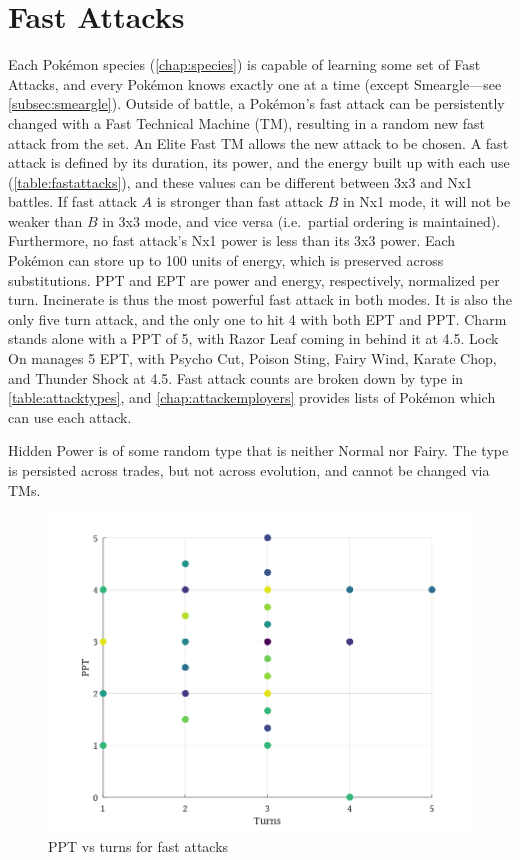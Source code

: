 \section{Fast Attacks}
Each Pokémon species (\autoref{chap:species}) is capable of learning some set of Fast Attacks, 
  and every Pokémon knows exactly one at a time (except Smeargle---see \autoref{subsec:smeargle}).
Outside of battle, a Pokémon's fast attack can be persistently changed with a
  Fast Technical Machine (TM), resulting in a random new fast attack from the set.
An Elite Fast TM allows the new attack to be chosen.
A fast attack is defined by its duration, its power, and the energy built up with each use (\autoref{table:fastattacks}),
  and these values can be different between 3x3 and Nx1 battles.
If fast attack $A$ is stronger than fast attack $B$ in Nx1 mode, it will not be
  weaker than $B$ in 3x3 mode, and vice versa (i.e.\ partial ordering is maintained).
Furthermore, no fast attack's Nx1 power is less than its 3x3 power.
Each Pokémon can store up to 100 units of energy, which is preserved across substitutions.
PPT and EPT are power and energy, respectively, normalized per turn.
Incinerate is thus the most powerful fast attack in both modes.
It is also the only five turn attack, and the only one to hit 4 with both EPT and PPT\@.
Charm stands alone with a PPT of 5, with Razor Leaf coming in behind it at 4.5.
Lock On manages 5 EPT, with Psycho Cut, Poison Sting, Fairy Wind, Karate Chop,
  and Thunder Shock at 4.5.
Fast attack counts are broken down by type in \autoref{table:attacktypes},
 and \autoref{chap:attackemployers} provides lists of Pokémon which can use each attack.


Hidden Power is of some random type that is neither Normal nor Fairy.
The type is persisted across trades, but not across evolution,
 and cannot be changed via TMs.

\begin{figure}[ht]
\includegraphics[keepaspectratio,width=\textwidth]{octave/pptvst.png}
  \caption{PPT vs turns for fast attacks\label{fig:pptvst}}
\end{figure}

